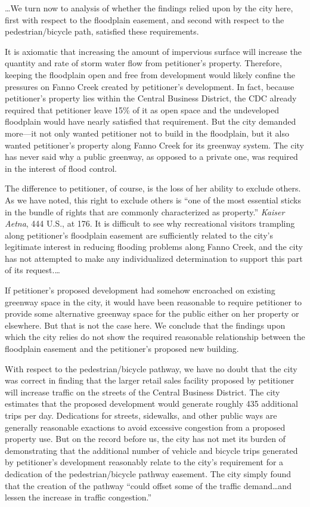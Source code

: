 \ldots We turn now to analysis of whether the findings relied upon by the city
here, first with respect to the floodplain easement, and second with respect to
the pedestrian/bicycle path, satisfied these requirements.

It is axiomatic that increasing the amount of impervious surface will increase
the quantity and rate of storm water flow from petitioner's property. Therefore,
keeping the floodplain open and free from development would likely confine the
pressures on Fanno Creek created by petitioner's development. In fact, because
petitioner's property lies within the Central Business District, the CDC already
required that petitioner leave 15\% of it as open space and the undeveloped
floodplain would have nearly satisfied that requirement. But the city demanded
more---it not only wanted petitioner not to build in the floodplain, but it also
wanted petitioner's property along Fanno Creek for its greenway system. The city
has never said why a public greenway, as opposed to a private one, was required
in the interest of flood control.

The difference to petitioner, of course, is the loss of her ability to exclude
others. As we have noted, this right to exclude others is ``one of the most
essential sticks in the bundle of rights that are commonly characterized as
property.'' \textit{Kaiser Aetna}, 444 U.S., at 176. It is difficult to see why
recreational visitors trampling along petitioner's floodplain easement are
sufficiently related to the city's legitimate interest in reducing flooding
problems along Fanno Creek, and the city has not attempted to make any
individualized determination to support this part of its request.\ldots

If petitioner's proposed development had somehow encroached on existing greenway
space in the city, it would have been reasonable to require petitioner to
provide some alternative greenway space for the public either on her property or
elsewhere. But that is not the case here. We conclude that the findings upon
which the city relies do not show the required reasonable relationship between
the floodplain easement and the petitioner's proposed new building.

With respect to the pedestrian/bicycle pathway, we have no doubt that the city
was correct in finding that the larger retail sales facility proposed by
petitioner will increase traffic on the streets of the Central Business
District. The city estimates that the proposed development would generate
roughly 435 additional trips per day. Dedications for streets, sidewalks, and
other public ways are generally reasonable exactions to avoid excessive
congestion from a proposed property use. But on the record before us, the city
has not met its burden of demonstrating that the additional number of vehicle
and bicycle trips generated by petitioner's development reasonably relate to the
city's requirement for a dedication of the pedestrian/bicycle pathway easement.
The city simply found that the creation of the pathway ``could offset some of
the traffic demand\ldots and lessen the increase in traffic congestion.''

